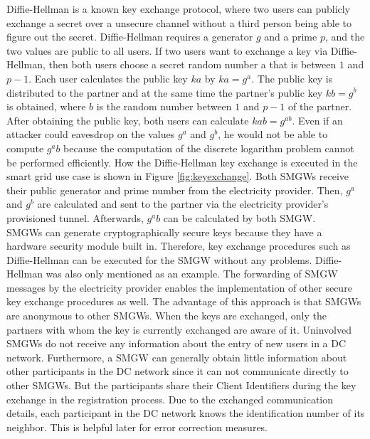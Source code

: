Diffie-Hellman is a known key exchange protocol, where two users can publicly exchange a secret over a unsecure channel without a third person being able to figure out the secret. 
Diffie-Hellman requires a generator $g$ and a prime $p$, and the two values are public to all users. If two users want to exchange a key via Diffie-Hellman, then both users choose a secret random number a that is between $1$ and $p-1$. Each user calculates the public key $ka$ by $ka=g^a$. The public key is distributed to the partner and at the same time the partner's public key $kb=g^b$ is obtained, where $b$ is the random number between $1$ and $p-1$ of the partner. After obtaining the public key, both users can calculate $kab=g^{ab}$.%
Even if an attacker could eavesdrop on the values $g^a$ and $g^b$, he would not be able to compute $g^ab$ because the computation of the discrete logarithm problem cannot be performed efficiently. How the Diffie-Hellman key exchange is executed in the smart grid use case is shown in Figure \ref{fig:keyexchange}. 
Both \gls{SMGW}s receive their public generator and prime number from the electricity provider. Then, $g^a$ and $g^b$ are calculated and sent to the partner via the electricity provider's provisioned tunnel. Afterwards, $g^ab$ can be calculated by both \gls{SMGW}.\\
\gls{SMGW}s can generate cryptographically secure keys because they have a hardware security module built in. Therefore, key exchange procedures such as Diffie-Hellman can be executed for the \gls{SMGW} without any problems. Diffie-Hellman was also only mentioned as an example. The forwarding of \gls{SMGW} messages by the electricity provider enables the implementation of other secure key exchange procedures as well. The advantage of this approach is that \gls{SMGW}s are anonymous to other \gls{SMGW}s. When the keys are exchanged, only the partners with whom the key is currently exchanged are aware of it. Uninvolved \gls{SMGW}s do not receive any information about the entry of new users in a DC network. Furthermore, a \gls{SMGW} can generally obtain little information about other participants in the DC network since it can not communicate directly to other \gls{SMGW}s. But the participants share their Client Identifiers during the key exchange in the registration process. Due to the exchanged communication details, each participant in the DC network knows the identification number of its neighbor. This is helpful later for error correction measures. %
